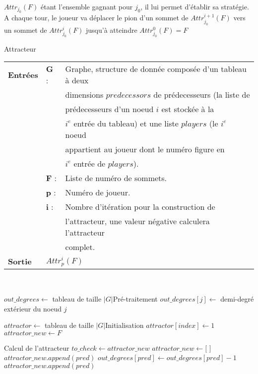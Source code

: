 \documentclass[12pt,a4paper,oneside, titlepage]{report}
\begin{document}
$Attr_{j_0}(F)$ étant l'ensemble gagnant pour $j_0$, il lui permet d'établir sa stratégie. A chaque tour, le joueur va déplacer le pion d'un sommet de $Attr_{j_0}^{i+1}(F)$ vers un sommet de $Attr_{j_0}^i(F)$ jusqu'à atteindre $Attr_{j_0}^0(F) = F$\\



\begin{algorithm}
\caption{Attracteur}\label{attractor}
\hspace*{\algorithmicindent} 
\begin{tabular}{lll}
	\textbf{Entrées} & \textbf{G} : &Graphe, structure de donnée composée d'un tableau à deux\\
	&&dimensions $predecessors$ de prédecesseurs (la liste de \\
	&&prédecesseurs d'un noeud $i$ est stockée à la \\
	&&$i^e$ entrée du tableau) et une liste $players$ (le $i^e$ noeud\\
	&&appartient au joueur dont le numéro figure en \\
	&&$i^e$ entrée de $players$).\\
	&\textbf{F} : &Liste de numéro de sommets.\\
	&\textbf{p} : &Numéro de joueur.\\
	&\textbf{i} : &Nombre d'itération pour la construction de\\
	&&l'attracteur, une valeur négative calculera l'attracteur\\
	&&complet.\\
	\textbf{Sortie} &\multicolumn{2}{l}{$Attr_p^i(F)$}\\
\end{tabular}\\
\begin{algorithmic}[1]
	\State $out\_degrees \gets$ tableau de taille $|G|$\Comment Pré-traitement
			\State $out\_degrees[j] \gets $ demi-degré extérieur du noeud $j$
		\EndIf
	\EndFor
	
	\State $attractor \gets$ tableau de taille $|G|$\Comment Initialisation
		\State $attractor[index] \gets 1$
	\EndFor
	\State $attractor\_new \gets F$
	
	\Comment Calcul de l'attracteur
		\State $to\_check \gets attractor\_new$
		\State $attractor\_new \gets [$ $]$
						\State $attractor\_new.append(pred)$
					\Else
						\State $out\_degrees[pred]\gets out\_degrees[pred]-1$
							\State $attractor\_new.append(pred)$
						\EndIf
					\EndIf
				\EndIf
			\EndFor
		\EndFor
\end{algorithmic}
\end{algorithm}
\end{document}
